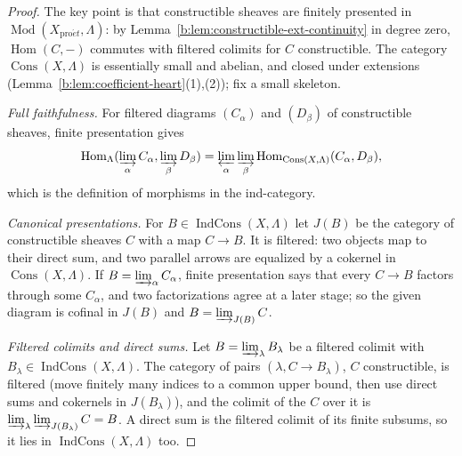 \documentclass[11pt,a4paper]{article}
\numberwithin{equation}{section}
\theoremstyle{definition}
\theoremstyle{remark}
\newcommand{\Mod}{\operatorname{Mod}}
\newcommand{\proet}{\mathrm{pro}\acute{e}t}
\newcommand{\Hom}{\operatorname{Hom}}
\newcommand{\Cons}{\operatorname{Cons}}
\newcommand{\IndCons}{\operatorname{IndCons}}
\begin{document}
\begin{proof}
The key point is that constructible sheaves are finitely
presented in $\Mod(X_{\proet},\Lambda)$: by
Lemma~\ref{b:lem:constructible-ext-continuity} in degree zero,
$\Hom(C,-)$ commutes with filtered colimits for $C$ constructible. The
category $\Cons(X,\Lambda)$ is essentially small and abelian, and closed
under extensions (Lemma~\ref{b:lem:coefficient-heart}(1),(2)); fix a small
skeleton.

\emph{Full faithfulness.} For filtered diagrams $(C_\alpha)$ and
$(D_\beta)$ of constructible sheaves, finite presentation gives
\[
 \Hom_{\Lambda}(\varinjlim_\alpha C_\alpha,\varinjlim_\beta D_\beta)
 =\varprojlim_\alpha\varinjlim_\beta\Hom_{\Cons(X,\Lambda)}(C_\alpha,D_\beta),
\]
which is the definition of morphisms in the ind-category.

\emph{Canonical presentations.} For $B\in\IndCons(X,\Lambda)$ let $J(B)$ be
the category of constructible sheaves $C$ with a map $C\to B$. It is
filtered: two objects map to their direct sum, and two parallel arrows
are equalized by a cokernel in $\Cons(X,\Lambda)$. If
$B=\varinjlim_\alpha C_\alpha$, finite presentation says that every
$C\to B$ factors through some $C_\alpha$, and two factorizations agree at
a later stage; so the given diagram is cofinal in $J(B)$ and
$B=\varinjlim_{J(B)}C$.

\emph{Filtered colimits and direct sums.} Let $B=\varinjlim_\lambda B_\lambda$
be a filtered colimit with $B_\lambda\in\IndCons(X,\Lambda)$. The category
of pairs $(\lambda,C\to B_\lambda)$, $C$ constructible, is filtered (move
finitely many indices to a common upper bound, then use direct sums and
cokernels in $J(B_\lambda)$), and the colimit of the $C$ over it is
$\varinjlim_\lambda\varinjlim_{J(B_\lambda)}C=B$. A direct sum is the
filtered colimit of its finite subsums, so it lies in $\IndCons(X,\Lambda)$
too.


\end{proof}
\end{document}
